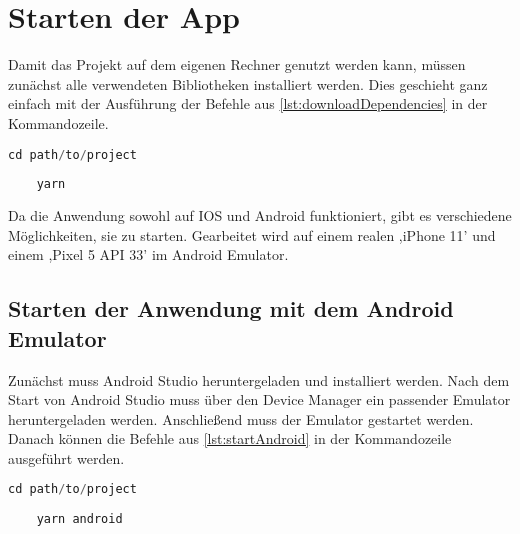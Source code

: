 \chapter{Starten der App}
Damit das Projekt auf dem eigenen Rechner genutzt werden kann, müssen zunächst alle verwendeten Bibliotheken installiert werden. Dies geschieht ganz einfach mit der Ausführung der Befehle aus \autoref{lst:downloadDependencies} in der Kommandozeile.

\begin{lstlisting}[caption={Diese Befehle müssen in die Kommandozeile eingegeben und anschließend ausgeführt werden, damit das Projekt verwendet werden kann. So werden die notwendigen Bibliotheken installiert.},captionpos=b, language=Java, label=lst:downloadDependencies]
	cd path/to/project
	
	yarn
\end{lstlisting}


Da die Anwendung sowohl auf IOS und Android funktioniert, gibt es verschiedene Möglichkeiten, sie zu starten. Gearbeitet wird auf einem realen ,iPhone 11' und einem ,Pixel 5 API 33' im Android Emulator.

\section{Starten der Anwendung mit dem Android Emulator}
Zunächst muss Android Studio heruntergeladen und installiert werden. Nach dem Start von Android Studio muss über den Device Manager ein passender Emulator heruntergeladen werden. Anschließend muss der Emulator gestartet werden. Danach können die Befehle aus \autoref{lst:startAndroid} in der Kommandozeile ausgeführt werden.
\begin{lstlisting}[caption={Um die Anwendung mit mit Android zu starten, sollte Android Studio heruntergeladen und installiert sein. Anschließend muss der passende Emulator über den Device Manager hinzugefügt und gestartet werden. Danach werden diese Befehle in die Kommandozeile eingegeben und ausgeführt.},captionpos=b, language=Java, label=lst:startAndroid]
	cd path/to/project
	
	yarn android
\end{lstlisting}


